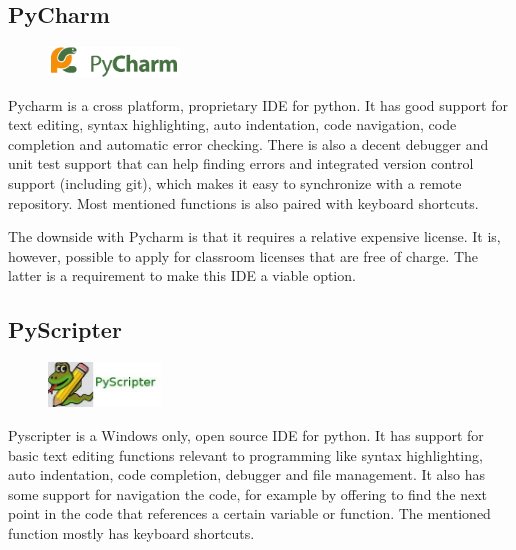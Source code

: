 \subsection{PyCharm}
\begin{figure}
	\begin{center}
	\vspace{-30pt}
		\includegraphics[width=3.5cm]{./planning/img/pycharm_logo}
	\vspace{-30pt}
	\end{center}
\end{figure}
Pycharm is a cross platform, proprietary IDE for python. It has good support
for text editing, syntax highlighting, auto indentation, code navigation, code
completion and automatic error checking. There is also a decent debugger and
unit test support that can help finding errors and integrated version control
support (including git), which makes it easy to synchronize with a remote
repository. Most mentioned functions is also paired with keyboard shortcuts.

The downside with Pycharm is that it requires a relative expensive license. It
is, however, possible to apply for classroom licenses that are free of charge.
The latter is a requirement to make this IDE a viable option.

\subsection{PyScripter}
\begin{figure}
	\begin{center}
	\vspace{-30pt}
		\includegraphics[width=3cm]{./planning/img/pyscripter_logo}
	\vspace{-30pt}
	\end{center}
\end{figure}
Pyscripter is a Windows only, open source IDE for python. It has support for
basic text editing functions relevant to programming like syntax highlighting,
auto indentation, code completion, debugger and file management. It also has
some support for navigation the code, for example by offering to find the next
point in the code that references a certain variable or function. The mentioned
function mostly has keyboard shortcuts.

